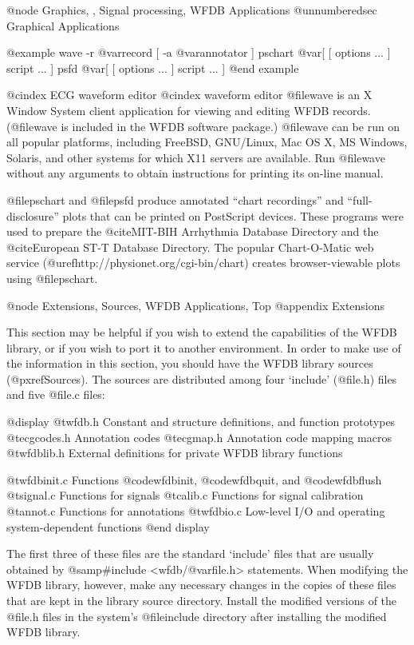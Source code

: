 {{{{{{{{@node     Graphics, , Signal processing, WFDB Applications
@unnumberedsec Graphical Applications

@example
wave -r @var{record [ }-a @var{annotator ]}
pschart @var{[ [ options ... ] script ... ]}
psfd @var{[ [ options ... ] script ... ]}
@end example

@cindex ECG waveform editor
@cindex waveform editor
@file{wave} is an X Window System client application for viewing
and editing WFDB records.  (@file{wave} is included in the WFDB software
package.)  @file{wave} can be
run on all popular platforms, including FreeBSD, GNU/Linux, Mac OS X,
MS Windows, Solaris, and other systems for which X11 servers are available.
Run @file{wave} without any arguments to obtain instructions for printing its
on-line manual.

@file{pschart} and @file{psfd} produce annotated ``chart recordings''
and ``full-disclosure'' plots that can be printed on PostScript devices.
These programs were used to prepare the @cite{MIT-BIH Arrhythmia
Database Directory} and the @cite{European ST-T Database
Directory}.  The popular Chart-O-Matic web service
(@uref{http://physionet.org/cgi-bin/chart}) creates browser-viewable plots
using @file{pschart}.

@node     Extensions, Sources, WFDB Applications, Top
@appendix Extensions

This section may be helpful if you wish to extend the capabilities of
the WFDB library, or if you wish to port it to another environment.  In
order to make use of the information in this section, you should have
the WFDB library sources (@pxref{Sources}).  The sources are distributed
among four `include' (@file{.h}) files and five @file{.c} files:

@display
@t{wfdb.h        } Constant and structure definitions, and function prototypes
@t{ecgcodes.h    } Annotation codes
@t{ecgmap.h      } Annotation code mapping macros
@t{wfdblib.h     } External definitions for private WFDB library functions

@t{wfdbinit.c    } Functions @code{wfdbinit}, @code{wfdbquit}, and @code{wfdbflush}
@t{signal.c      } Functions for signals
@t{calib.c       } Functions for signal calibration
@t{annot.c       } Functions for annotations
@t{wfdbio.c      } Low-level I/O and operating system-dependent functions
@end display

The first three of these files are the standard `include' files that
are usually obtained by @samp{#include <wfdb/@var{file}.h>} statements.
When modifying the WFDB library, however, make any necessary changes in
the copies of these files that are kept in the library source
directory.  Install the modified versions of the @file{.h} files in the
system's @file{include} directory after installing the modified WFDB
library.

}}}}}}}}

